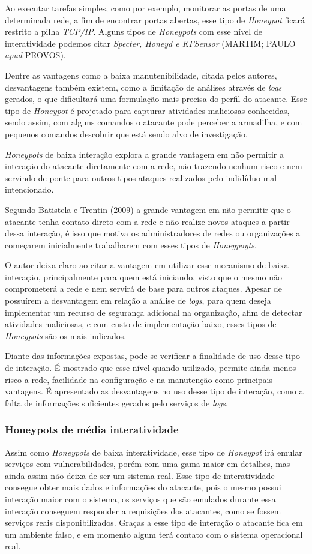 Ao executar tarefas simples, como por exemplo, monitorar as portas de uma determinada rede, a fim de encontrar portas abertas, esse tipo de \textit{Honeypot} ficará restrito a pilha \textit{TCP/IP}. Alguns tipos de \textit{Honeypots} com esse nível de interatividade podemos citar \textit{Specter, Honeyd e KFSensor} (MARTIM; PAULO \textit{apud} PROVOS).

Dentre as vantagens como a baixa manutenibilidade, citada pelos autores, desvantagens também existem, como a limitação de análises através de \textit{logs} gerados, o que dificultará uma formulação mais precisa do perfil do atacante. Esse tipo de \textit{Honeypot} é projetado para capturar atividades maliciosas conhecidas, sendo assim, com alguns comandos o atacante pode perceber a armadilha, e com pequenos comandos descobrir que está sendo alvo de investigação.

\textit{Honeypots} de baixa interação explora a grande vantagem em não permitir a interação do atacante diretamente com a rede, não trazendo nenhum risco e nem servindo de ponte para outros tipos ataques realizados pelo indidíduo mal-intencionado.

Segundo Batistela e Trentin (2009) a grande vantagem em não permitir que o atacante tenha contato direto com a rede e não realize novos ataques a partir dessa interação, é isso que motiva os administradores de redes ou organizações a começarem inicialmente trabalharem com esses tipos de \textit{Honeypoyts}.

O autor deixa claro ao citar a vantagem em utilizar esse mecanismo de baixa interação, principalmente para quem está iniciando, visto que o mesmo não comprometerá a rede e nem servirá de base para outros ataques. Apesar de possuírem a desvantagem em relação a análise de \textit{logs}, para quem deseja implementar um recurso de segurança adicional na organização, afim de detectar atividades maliciosas, e com custo de implementação baixo, esses tipos de \textit{Honeypots} são os mais indicados.

Diante das informações expostas, pode-se verificar a finalidade de uso desse tipo de interação. É mostrado que esse nível quando utilizado, permite ainda menos risco a rede, facilidade na configuração e na manutenção como principais vantagens. É apresentado as desvantagens no uso desse tipo de interação, como a falta de informações suficientes gerados pelo serviços de \textit{logs}.

\subsubsection{Honeypots de média interatividade}
Assim como \textit{Honeypots} de baixa interatividade, esse tipo de \textit{Honeypot} irá emular serviços com vulnerabilidades, porém com uma gama maior em detalhes, mas ainda assim não deixa de ser um sistema real. Esse tipo de interatividade consegue obter mais dados e informações do atacante, pois o mesmo possui interação maior com o sistema, os serviços que são emulados durante essa interação conseguem responder a requisições dos atacantes, como se fossem serviços reais disponibilizados. Graças a esse tipo de interação o atacante fica em um ambiente falso, e em momento algum terá contato com o sistema operacional real.


